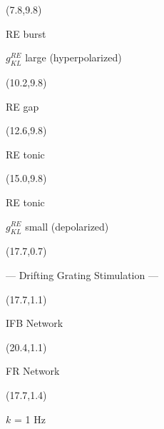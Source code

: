 \documentclass[a0]{a0poster}
\def\CHead#1{\begin{center} {\LARGE\color{DarkBlue} #1} \end{center}}
\begin{document}
\begin{textblock}{2.6}(7.8,9.8)
\begin{center}
RE burst 


$g_{KL}^{RE}$ large (hyperpolarized)
\end{center}
\end{textblock}
\begin{textblock}{2.6}(10.2,9.8)
\begin{center}
RE gap 

\end{center}
\end{textblock}
\begin{textblock}{2.6}(12.6,9.8)
\begin{center}
RE tonic 

\end{center}
\end{textblock}
\begin{textblock}{2.6}(15.0,9.8)
\begin{center}
RE tonic 


$g_{KL}^{RE}$ small (depolarized) 
\end{center}
\end{textblock}


\begin{textblock}{5.3}(17.7,0.7)
\CHead{--- Drifting Grating Stimulation --- } 
\end{textblock}

\begin{textblock}{2.6}(17.7,1.1)
\CHead{\Large IFB Network} 
\end{textblock}

\begin{textblock}{2.6}(20.4,1.1)
\CHead{\Large FR Network} 
\end{textblock}

\begin{textblock}{2.6}(17.7,1.4)
\begin{center}
$k$ = 1 Hz

\end{center}
\end{textblock}
\end{document}
